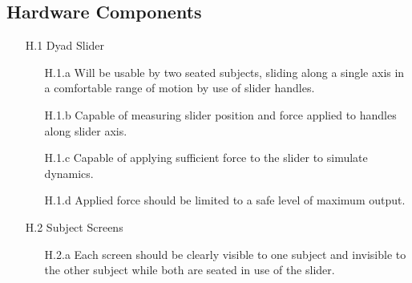 \documentclass{article}
\begin{document}
\subsection*{Hardware Components}
    \begin{enumerate}
    \item[H.1] Dyad Slider
        \begin{enumerate}
        \item[H.1.a] Will be usable by two seated subjects, sliding along a single axis in a comfortable range of motion by use of slider handles.
        \item[H.1.b] Capable of measuring slider position and force applied to handles along slider axis.
        \item[H.1.c] Capable of applying sufficient force to the slider to simulate dynamics.
        \item[H.1.d] Applied force should be limited to a safe level of maximum output.
        \end{enumerate}
    \item[H.2] Subject Screens
        \begin{enumerate}
        \item[H.2.a] Each screen should be clearly visible to one subject and invisible to the other subject while both are seated in use of the slider.
        \end{enumerate}
    \end{enumerate}
\end{document}
